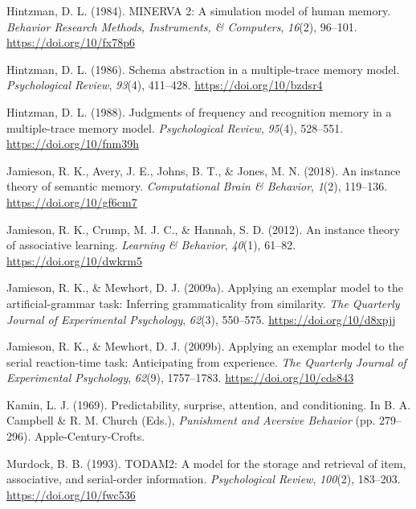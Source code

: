 \documentclass[
  english,
  man,floatsintext]{apa6}
\begin{document}
\leavevmode\hypertarget{ref-hintzmanMINERVASimulationModel1984}{}%
Hintzman, D. L. (1984). MINERVA 2: A simulation model of human memory. \emph{Behavior Research Methods, Instruments, \& Computers}, \emph{16}(2), 96--101. \url{https://doi.org/10/fx78p6}

\leavevmode\hypertarget{ref-hintzmanSchemaAbstractionMultipletrace1986}{}%
Hintzman, D. L. (1986). Schema abstraction in a multiple-trace memory model. \emph{Psychological Review}, \emph{93}(4), 411--428. \url{https://doi.org/10/bzdsr4}

\leavevmode\hypertarget{ref-hintzmanJudgmentsFrequencyRecognition1988}{}%
Hintzman, D. L. (1988). Judgments of frequency and recognition memory in a multiple-trace memory model. \emph{Psychological Review}, \emph{95}(4), 528--551. \url{https://doi.org/10/fnm39h}

\leavevmode\hypertarget{ref-jamiesonInstanceTheorySemantic2018}{}%
Jamieson, R. K., Avery, J. E., Johns, B. T., \& Jones, M. N. (2018). An instance theory of semantic memory. \emph{Computational Brain \& Behavior}, \emph{1}(2), 119--136. \url{https://doi.org/10/gf6cm7}

\leavevmode\hypertarget{ref-jamiesonInstanceTheoryAssociative2012}{}%
Jamieson, R. K., Crump, M. J. C., \& Hannah, S. D. (2012). An instance theory of associative learning. \emph{Learning \& Behavior}, \emph{40}(1), 61--82. \url{https://doi.org/10/dwkrm5}

\leavevmode\hypertarget{ref-jamiesonApplyingExemplarModel2009}{}%
Jamieson, R. K., \& Mewhort, D. J. (2009a). Applying an exemplar model to the artificial-grammar task: Inferring grammaticality from similarity. \emph{The Quarterly Journal of Experimental Psychology}, \emph{62}(3), 550--575. \url{https://doi.org/10/d8xpjj}

\leavevmode\hypertarget{ref-jamiesonApplyingExemplarModel2009a}{}%
Jamieson, R. K., \& Mewhort, D. J. (2009b). Applying an exemplar model to the serial reaction-time task: Anticipating from experience. \emph{The Quarterly Journal of Experimental Psychology}, \emph{62}(9), 1757--1783. \url{https://doi.org/10/cds843}

\leavevmode\hypertarget{ref-kaminPredictabilitySurpriseAttention1969}{}%
Kamin, L. J. (1969). Predictability, surprise, attention, and conditioning. In B. A. Campbell \& R. M. Church (Eds.), \emph{Punishment and Aversive Behavior} (pp. 279--296). Apple-Century-Crofts.

\leavevmode\hypertarget{ref-murdockTODAM2ModelStorage1993}{}%
Murdock, B. B. (1993). TODAM2: A model for the storage and retrieval of item, associative, and serial-order information. \emph{Psychological Review}, \emph{100}(2), 183--203. \url{https://doi.org/10/fwc536}
\end{document}

